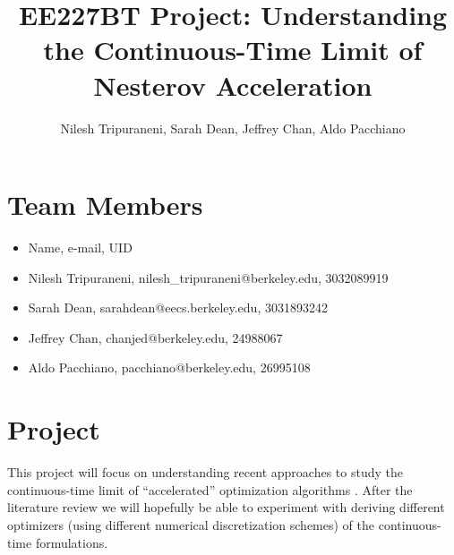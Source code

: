 \documentclass{article}
\title{EE227BT Project:
Understanding the Continuous-Time Limit of Nesterov Acceleration}
\author{Nilesh Tripuraneni, Sarah Dean, Jeffrey Chan, Aldo Pacchiano}
\begin{document}
\maketitle{}
\section{Team Members}

\begin{itemize}
  \item Name, e-mail, UID
  \item Nilesh Tripuraneni, nilesh\_tripuraneni@berkeley.edu, 3032089919
  \item Sarah Dean, sarahdean@eecs.berkeley.edu, 3031893242
  \item Jeffrey Chan, chanjed@berkeley.edu, 24988067
  \item Aldo Pacchiano, pacchiano@berkeley.edu, 26995108
\end{itemize}

\section{Project}

This project will focus on understanding recent approaches to study the continuous-time limit of ``accelerated'' optimization algorithms \cite{su2014differential, wibisono2016variational, krichene2015accelerated}. After
the literature review we will hopefully be able to experiment with deriving different optimizers (using different numerical discretization schemes) of the continuous-time formulations.




\end{document}
